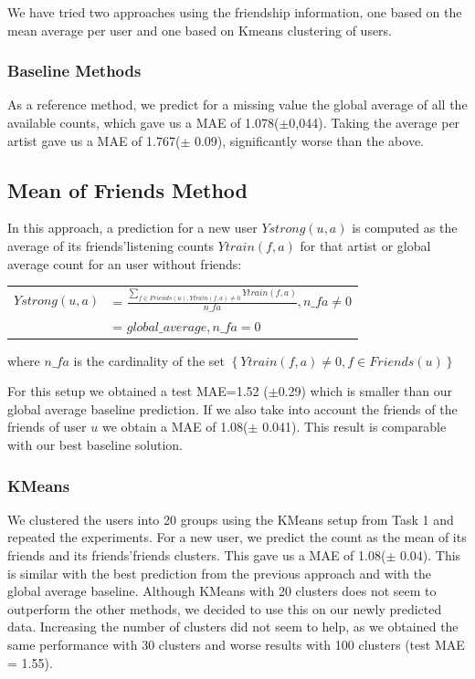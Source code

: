 We have tried two approaches using the friendship information, one based on the mean average per user and one based on Kmeans clustering of users.

\subsubsection{Baseline Methods}
As a reference method, we predict for a missing value the global average of all the available counts, which gave us a MAE of 1.078($\pm$0,044). Taking the average per artist gave us a MAE of 1.767($\pm$  0.09), significantly worse than the above.

\subsection{Mean of Friends Method}
 In this approach, a prediction for a new user $Ystrong(u,a)$ is computed as the average of its friends'listening counts $Ytrain(f,a)$ for that artist or global average count for an user without friends:

\begin{table}[h]
  \centering
  \begin{tabular}{ c  l }
  $Ystrong(u,a) $&= $\frac{\sum_{f\in Friends(u), Ytrain(f,a)\neq0}{Ytrain(f,a)}}{n\_fa}, n\_fa \neq 0$ \\ 
                          &= $global\_average, n\_fa = 0$ \\ 
  \end{tabular}
\end{table}
where $n\_fa$ is the cardinality of the set $\left\{ Ytrain(f,a)\neq0, f\in Friends(u)\right\}$

For this setup  we obtained a test MAE=1.52 ($\pm$0.29) which is smaller than our global average baseline prediction.
If we also take into account the friends of the friends of user $u$ we obtain  a MAE of 1.08($\pm$ 0.041). This result is comparable with our best baseline solution.

\subsubsection{KMeans}
We clustered the users into 20 groups using the KMeans setup from Task 1
and repeated the experiments. For a new user,  we predict the count as the mean of its friends and its friends'friends clusters. This gave us a MAE of
1.08($\pm$ 0.04). This is similar with the best prediction from the previous approach and with the  global average baseline. Although KMeans with 20 clusters does not seem to outperform the other methods, we decided to use this on our newly predicted data.
Increasing the number of clusters did not seem to help, as we obtained the same performance with 30 clusters and worse results with 100 clusters (test MAE = 1.55). 
 

